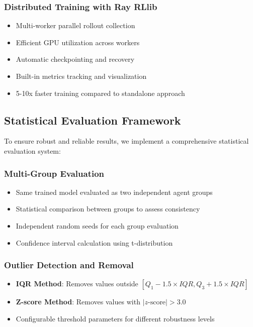 \documentclass[12pt,a4paper]{report}
\begin{document}
\subsubsection{Distributed Training with Ray RLlib}
\begin{itemize}
\item Multi-worker parallel rollout collection
\item Efficient GPU utilization across workers
\item Automatic checkpointing and recovery
\item Built-in metrics tracking and visualization
\item 5-10x faster training compared to standalone approach
\end{itemize}

\subsection{Statistical Evaluation Framework}
To ensure robust and reliable results, we implement a comprehensive statistical evaluation system:

\subsubsection{Multi-Group Evaluation}
\begin{itemize}
\item Same trained model evaluated as two independent agent groups
\item Statistical comparison between groups to assess consistency
\item Independent random seeds for each group evaluation
\item Confidence interval calculation using t-distribution
\end{itemize}

\subsubsection{Outlier Detection and Removal}
\begin{itemize}
\item \textbf{IQR Method}: Removes values outside $[Q_1 - 1.5 \times IQR, Q_3 + 1.5 \times IQR]$
\item \textbf{Z-score Method}: Removes values with $|z\text{-score}| > 3.0$
\item Configurable threshold parameters for different robustness levels
\end{itemize}
\end{document}
